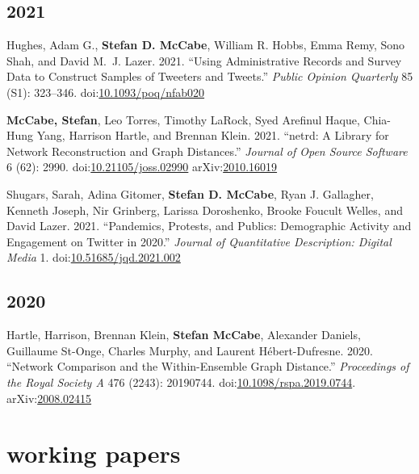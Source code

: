 \documentclass[11pt, letter]{article}
\begin{document}
\subsection{2021}
\begin{hangparas}{.25in}{1}
Hughes, Adam G.,\textsuperscript{\textdagger} \textbf{Stefan D.
McCabe},\textsuperscript{\textdagger} William R. Hobbs, Emma Remy, Sono
Shah, and David M.~J. Lazer. 2021. ``Using Administrative Records and
Survey Data to Construct Samples of Tweeters and Tweets.'' \textit{Public
Opinion Quarterly} 85 (S1): 323--346.
doi:\href{https://doi.org/10.1093/poq/nfab020}{10.1093/poq/nfab020}
\vspace{-1mm}

\textbf{McCabe, Stefan}, Leo Torres, Timothy LaRock, Syed Arefinul Haque,
Chia-Hung Yang, Harrison Hartle, and Brennan Klein. 2021.
``netrd: A Library for Network Reconstruction and Graph Distances.''
\textit{Journal of Open Source Software} 6 (62): 2990.
doi:\href{https://doi.org/10.21105/joss.02990}{10.21105/joss.02990}
arXiv:\href{https://arxiv.org/abs/2010.16019}{2010.16019} \vspace{-1mm}

Shugars, Sarah, Adina Gitomer, \textbf{Stefan D. McCabe}, Ryan J. Gallagher,
Kenneth Joseph, Nir Grinberg, Larissa Doroshenko, Brooke Foucult Welles, and
David Lazer. 2021. ``Pandemics, Protests, and Publics: Demographic Activity and
Engagement on Twitter in 2020.'' \textit{Journal of Quantitative Description:
  Digital Media} 1.
doi:\href{https://doi.org/10.51685/jqd.2021.002}{10.51685/jqd.2021.002} \vspace{2mm}
\end{hangparas}

\subsection{2020}
\begin{hangparas}{.25in}{1}
  Hartle, Harrison, Brennan Klein, \textbf{Stefan McCabe}, Alexander Daniels,
  Guillaume St-Onge, Charles Murphy, and Laurent Hébert-Dufresne. 2020.
  ``Network Comparison and the Within-Ensemble Graph Distance.''
  \textit{Proceedings of the Royal Society A} 476 (2243): 20190744.
  doi:\href{https://doi.org/10.1098/rspa.2019.0744}{10.1098/rspa.2019.0744}.
  arXiv:\href{https://arxiv.org/abs/2008.02415}{2008.02415} \vspace{2mm}
\end{hangparas}

\section{working papers}
\end{document}

